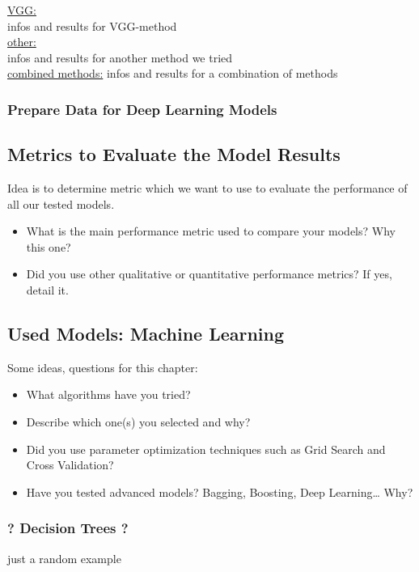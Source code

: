\documentclass{article}
\begin{document}
\underline{VGG:}\\
infos and results for VGG-method
\\

\underline{other:}\\
infos and results for another method we tried
\\

\underline{combined methods:}
infos and results for a combination of methods
\\

\subsubsection{Prepare Data for Deep Learning Models}

\subsection{Metrics to Evaluate the Model Results}

Idea is to determine metric which we want to use to evaluate the performance of all our tested models.
\begin{itemize}
    \item What is the main performance metric used to compare your models? Why
    this one?
    \item Did you use other qualitative or quantitative performance metrics? If yes,
    detail it.
\end{itemize}


\subsection{Used Models: Machine Learning}
Some ideas, questions for this chapter:

\begin{itemize}
    \item What algorithms have you tried?
    \item Describe which one(s) you selected and why?
    \item Did you use parameter optimization techniques such as Grid Search and Cross Validation?
    \item Have you tested advanced models? Bagging, Boosting, Deep Learning… Why?
\end{itemize}

\subsubsection{? Decision Trees ?}
just a random example
\end{document}
